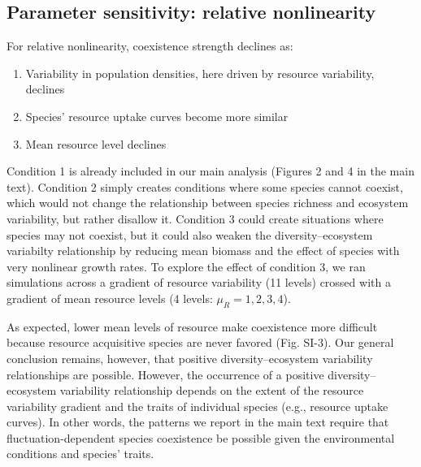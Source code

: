 \documentclass[11pt,]{article}
\providecommand{\tightlist}{%
  \setlength{\itemsep}{0pt}\setlength{\parskip}{0pt}}
\begin{document}
\subsection{Parameter sensitivity: relative nonlinearity}

For relative nonlinearity, coexistence strength declines as:

\begin{enumerate}
\def\labelenumi{\arabic{enumi}.}
\tightlist
\item
  Variability in population densities, here driven by resource
  variability, declines
\item
  Species' resource uptake curves become more similar
\item
  Mean resource level declines
\end{enumerate}

Condition 1 is already included in our main analysis (Figures 2 and 4 in
the main text). Condition 2 simply creates conditions where some species
cannot coexist, which would not change the relationship between species
richness and ecosystem variability, but rather disallow it. Condition 3
could create situations where species may not coexist, but it could also
weaken the diversity--ecosystem variabilty relationship by reducing mean
biomass and the effect of species with very nonlinear growth rates. To
explore the effect of condition 3, we ran simulations across a gradient
of resource variability (11 levels) crossed with a gradient of mean
resource levels (4 levels: \(\mu_R = 1,2,3,4\)).

As expected, lower mean levels of resource make coexistence more
difficult because resource acquisitive species are never favored (Fig.
SI-3). Our general conclusion remains, however, that positive
diversity--ecosystem variability relationships are possible. However,
the occurrence of a positive diversity--ecosystem variability
relationship depends on the extent of the resource variability gradient
and the traits of individual species (e.g., resource uptake curves). In
other words, the patterns we report in the main text require that
fluctuation-dependent species coexistence be possible given the
environmental conditions and species' traits.
\end{document}
